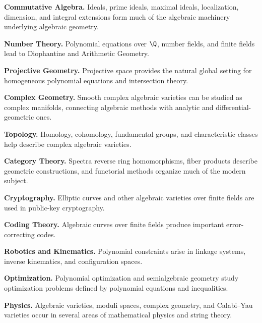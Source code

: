 \begin{applicationbox}
\textbf{Commutative Algebra.}
Ideals, prime ideals, maximal ideals, localization, dimension, and integral
extensions form much of the algebraic machinery underlying algebraic
geometry.

\medskip

\textbf{Number Theory.}
Polynomial equations over \(\Q\), number fields, and finite fields lead to
Diophantine and Arithmetic Geometry.

\medskip

\textbf{Projective Geometry.}
Projective space provides the natural global setting for homogeneous
polynomial equations and intersection theory.

\medskip

\textbf{Complex Geometry.}
Smooth complex algebraic varieties can be studied as complex manifolds,
connecting algebraic methods with analytic and differential-geometric ones.

\medskip

\textbf{Topology.}
Homology, cohomology, fundamental groups, and characteristic classes help
describe complex algebraic varieties.

\medskip

\textbf{Category Theory.}
Spectra reverse ring homomorphisms, fiber products describe geometric
constructions, and functorial methods organize much of the modern subject.

\medskip

\textbf{Cryptography.}
Elliptic curves and other algebraic varieties over finite fields are used in
public-key cryptography.

\medskip

\textbf{Coding Theory.}
Algebraic curves over finite fields produce important error-correcting codes.

\medskip

\textbf{Robotics and Kinematics.}
Polynomial constraints arise in linkage systems, inverse kinematics, and
configuration spaces.

\medskip

\textbf{Optimization.}
Polynomial optimization and semialgebraic geometry study optimization
problems defined by polynomial equations and inequalities.

\medskip

\textbf{Physics.}
Algebraic varieties, moduli spaces, complex geometry, and Calabi--Yau
varieties occur in several areas of mathematical physics and string theory.
\end{applicationbox}

